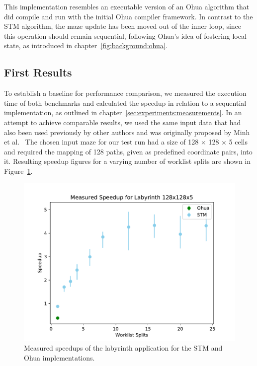 This implementation resembles an executable version of an Ohua algorithm that did compile and run with the initial Ohua compiler framework.
In contrast to the STM algorithm, the maze update has been moved out of the inner loop, since this operation should remain sequential, following Ohua's idea of fostering local state, as introduced in chapter~\ref{fig:background:ohua}.

\subsection{First Results}

To establish a baseline for performance comparison, we measured the execution time of both benchmarks and calculated the speedup in relation to a sequential implementation, as outlined in chapter~\ref{sec:experiments:measurements}.
In an attempt to achieve comparable results, we used the same input data that had also been used previously by other authors and was originally proposed by Minh et al.~\cite{minh2008stamp}
The chosen input maze for our test run had a size of 128 $\times$ 128 $\times$ 5 cells and required the mapping of 128 paths, given as predefined coordinate pairs, into it.
Resulting speedup figures for a varying number of worklist splits are shown in Figure~\ref{fig:preliminaries:initial-results}.

\begin{figure}[h]
    \centering
    \includegraphics[width=.5\textwidth,keepaspectratio]{gfx/preliminaries-labyrinth/2019-04-18-128x128x5}
    \caption{Measured speedups of the labyrinth application for the STM and Ohua implementations.}%
    \label{fig:preliminaries:initial-results}
\end{figure}

